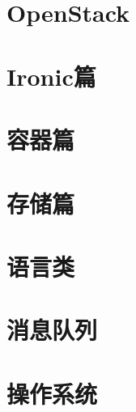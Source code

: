\documentclass[b5paper]{book}
\begin{document}
\begin{titlepage}
    \\
    \vspace{\fill}
    \\
    \vspace{80mm}
\end{titlepage}

\newpage

\frontmatter
{
  \renewcommand*\contentsname{目录}
  \tableofcontents%
  \thispagestyle{empty}
}

\mainmatter

\part{OpenStack}

\part{Ironic篇}





\part{容器篇}




\part{存储篇}


\part{语言类}





\part{消息队列}

\part{操作系统}



\end{document}
